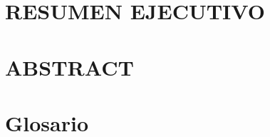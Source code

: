 \documentclass[
	12pt,			%
	letterpaper,	%
    oneside		%
]{thesis_utfsm}
\begin{document}
\pagestyle{plain}           %


\frontmatter                %





\section*{RESUMEN EJECUTIVO}


\section*{ABSTRACT}

\section*{Glosario}


\begin{spacing}{1}      %
    \tableofcontents\listoftables\listoffigures
\end{spacing}



\mainmatter             %
\end{document}
